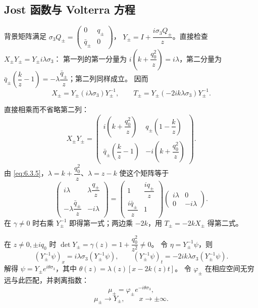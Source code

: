 \documentclass[lang=cn,scheme=chinese,mode=simple,device=normal,color=blue,
math=cm,thmcnt=section,12pt]{elegantbook}
\newcommand{\eqq}[2]{\tag{#1}\label{eq:#1}#2}
\begin{document}
\subsection{Jost 函数与 Volterra 方程}
背景矩阵满足 $\sigma_3Q_\pm=\begin{pmatrix}0&q_\pm\\\bar q_\pm&0\end{pmatrix}$，
$Y_\pm=I+\dfrac{i\sigma_3Q_\pm}{z}$。直接检查 $X_\pm Y_\pm=Y_\pm i\lambda\sigma_3$：
第一列的第一分量为 $i(k+\dfrac{q_0^2}{z})=i\lambda$，第二分量为
$\bar q_\pm(\dfrac{k}{z}-1)=-\lambda\dfrac{\bar q_\pm}{z}$；第二列同样成立。
因而
\begin{equation}\eqq{6.4.1}{X_\pm=Y_\pm(i\lambda\sigma_3)Y_\pm^{-1},\qquad
        T_\pm=Y_\pm(-2ik\lambda\sigma_3)Y_\pm^{-1}.}\end{equation}

\begin{callout}[计算：对角化的四个矩阵元]
    直接相乘而不省略第二列：
    \[
        X_\pm Y_\pm=
        \begin{pmatrix}i(k+\dfrac{q_0^2}{z})      & q_\pm(1-\dfrac{k}{z})  \\
               \bar q_\pm(\dfrac{k}{z}-1) & -i(k+\dfrac{q_0^2}{z})\end{pmatrix}.
    \]
    由 \eqref{eq:6.3.5}，$\lambda=k+\dfrac{q_0^2}{z}$、$\lambda=z-k$ 使这个矩阵等于
    \[
        \begin{pmatrix}i\lambda&\lambda \dfrac{q_\pm}{z}\\-\lambda\dfrac{\bar q_\pm}{z}&-i\lambda\end{pmatrix}
        =\begin{pmatrix}1&\dfrac{iq_\pm}{z}\\\dfrac{i\bar q_\pm}{z}&1\end{pmatrix}
        \begin{pmatrix}i\lambda&0\\0&-i\lambda\end{pmatrix}.
    \]
    在 $\gamma\ne0$ 时右乘 $Y_\pm^{-1}$ 即得第一式；两边乘 $-2k$，用 $T_\pm=-2kX_\pm$ 得第二式。
\end{callout}

在 $z\ne0,\pm iq_0$ 时 $\det Y_\pm=\gamma(z)=1+\dfrac{q_0^2}{z^2}\ne0$。
令 $\eta=Y_\pm^{-1}\psi$，则
\begin{equation}\eqq{6.4.2}{(Y_\pm^{-1}\psi)_x=i\lambda\sigma_3(Y_\pm^{-1}\psi),\qquad
        (Y_\pm^{-1}\psi)_t=-2ik\lambda\sigma_3(Y_\pm^{-1}\psi).}\end{equation}
解得 $\psi=Y_\pm e^{i\theta\sigma_3}$，其中
$\theta(z)=\lambda(z)[x-2k(z)t]$。
令 $\varphi_\pm$ 在相应空间无穷远与此匹配，并剥离指数：
\begin{equation}\eqq{6.4.3}{\mu_\pm=\varphi_\pm e^{-i\theta\sigma_3},}\end{equation}
\begin{equation}\eqq{6.4.4}{\mu_\pm\to Y_\pm,\qquad x\to\pm\infty.}\end{equation}
\end{document}
